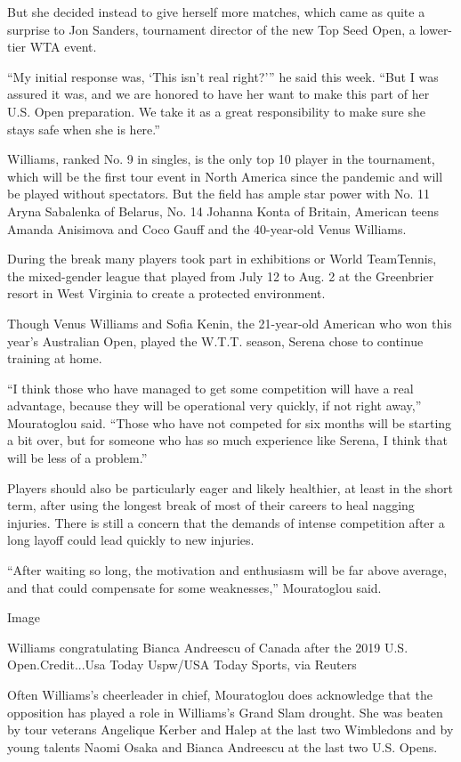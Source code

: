 But she decided instead to give herself more matches, which came as
quite a surprise to Jon Sanders, tournament director of the new Top Seed
Open, a lower-tier WTA event.

``My initial response was, `This isn't real right?''' he said this week.
``But I was assured it was, and we are honored to have her want to make
this part of her U.S. Open preparation. We take it as a great
responsibility to make sure she stays safe when she is here.''

Williams, ranked No. 9 in singles, is the only top 10 player in the
tournament, which will be the first tour event in North America since
the pandemic and will be played without spectators. But the field has
ample star power with No. 11 Aryna Sabalenka of Belarus, No. 14 Johanna
Konta of Britain, American teens Amanda Anisimova and Coco Gauff and the
40-year-old Venus Williams.

During the break many players took part in exhibitions or World
TeamTennis, the mixed-gender league that played from July 12 to Aug. 2
at the Greenbrier resort in West Virginia to create a protected
environment.

Though Venus Williams and Sofia Kenin, the 21-year-old American who won
this year's Australian Open, played the W.T.T. season, Serena chose to
continue training at home.

``I think those who have managed to get some competition will have a
real advantage, because they will be operational very quickly, if not
right away,'' Mouratoglou said. ``Those who have not competed for six
months will be starting a bit over, but for someone who has so much
experience like Serena, I think that will be less of a problem.''

Players should also be particularly eager and likely healthier, at least
in the short term, after using the longest break of most of their
careers to heal nagging injuries. There is still a concern that the
demands of intense competition after a long layoff could lead quickly to
new injuries.

``After waiting so long, the motivation and enthusiasm will be far above
average, and that could compensate for some weaknesses,'' Mouratoglou
said.

Image

Williams congratulating Bianca Andreescu of Canada after the 2019 U.S.
Open.Credit...Usa Today Uspw/USA Today Sports, via Reuters

Often Williams's cheerleader in chief, Mouratoglou does acknowledge that
the opposition has played a role in Williams's Grand Slam drought. She
was beaten by tour veterans Angelique Kerber and Halep at the last two
Wimbledons and by young talents Naomi Osaka and Bianca Andreescu at the
last two U.S. Opens.

